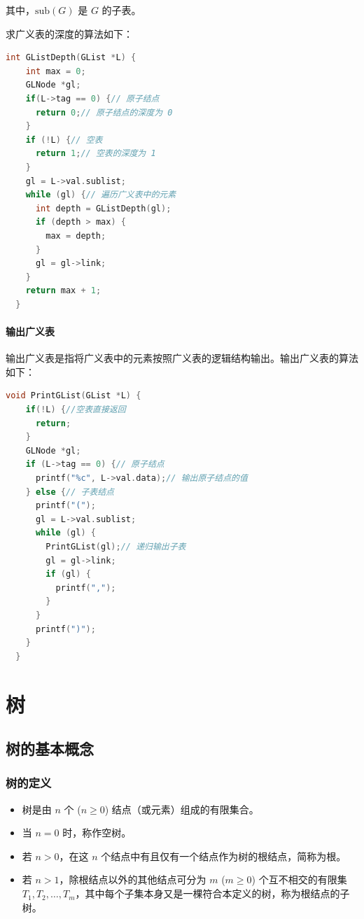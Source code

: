 \documentclass[lang=cn,newtx,10pt,scheme=chinese]{elegantbook}
\begin{document}
其中，$\text{sub}(G)$ 是 $G$ 的子表。

求广义表的深度的算法如下：

\begin{lstlisting}[language=C++, caption={广义表的深度}]
  int GListDepth(GList *L) {
    int max = 0;
    GLNode *gl;
    if(L->tag == 0) {// 原子结点
      return 0;// 原子结点的深度为 0
    }
    if (!L) {// 空表
      return 1;// 空表的深度为 1
    }
    gl = L->val.sublist;
    while (gl) {// 遍历广义表中的元素
      int depth = GListDepth(gl);
      if (depth > max) {
        max = depth;
      }
      gl = gl->link;
    }
    return max + 1;
  }
\end{lstlisting}


\subsubsection{输出广义表}

输出广义表是指将广义表中的元素按照广义表的逻辑结构输出。输出广义表的算法如下：

\begin{lstlisting}[language=C++, caption={输出广义表}]
  void PrintGList(GList *L) {
    if(!L) {//空表直接返回
      return;
    }
    GLNode *gl;
    if (L->tag == 0) {// 原子结点
      printf("%c", L->val.data);// 输出原子结点的值
    } else {// 子表结点
      printf("(");
      gl = L->val.sublist;
      while (gl) {
        PrintGList(gl);// 递归输出子表
        gl = gl->link;
        if (gl) {
          printf(",");
        }
      }
      printf(")");
    }
  }
\end{lstlisting}
\chapter{树}

\section{树的基本概念}

\subsection{树的定义}

\begin{itemize}
  \item 树是由 $n$ 个 ($n \geq 0$) 结点（或元素）组成的有限集合。
  \item 当 $n = 0$ 时，称作空树。
  \item 若 $n > 0$，在这 $n$ 个结点中有且仅有一个结点作为树的根结点，简称为根。
  \item 若 $n > 1$，除根结点以外的其他结点可分为 $m$ ($m \geq 0$) 个互不相交的有限集 $T_1, T_2, \dots, T_m$，其中每个子集本身又是一棵符合本定义的树，称为根结点的子树。
\end{itemize}
\end{document}
